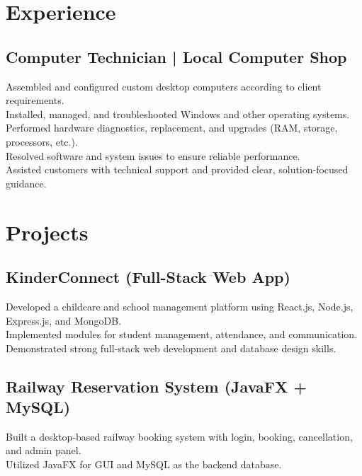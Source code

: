 \documentclass[]{deedy-resume-openfont}
\begin{document}
\hfill
\begin{minipage}[t]{0.66\textwidth} 


\section*{Experience}

\subsection*{Computer Technician | Local Computer Shop}
Assembled and configured custom desktop computers according to client requirements. \\
Installed, managed, and troubleshooted Windows and other operating systems. \\
Performed hardware diagnostics, replacement, and upgrades (RAM, storage, processors, etc.). \\
Resolved software and system issues to ensure reliable performance. \\
Assisted customers with technical support and provided clear, solution-focused guidance. \\



\section*{Projects}

\subsection*{KinderConnect (Full-Stack Web App)}
Developed a childcare and school management platform using React.js, Node.js, Express.js, and MongoDB. \\
Implemented modules for student management, attendance, and communication. \\
Demonstrated strong full-stack web development and database design skills. \\

\subsection*{Railway Reservation System (JavaFX + MySQL)}
Built a desktop-based railway booking system with login, booking, cancellation, and admin panel. \\
Utilized JavaFX for GUI and MySQL as the backend database. \\


\end{minipage}
\end{document}
